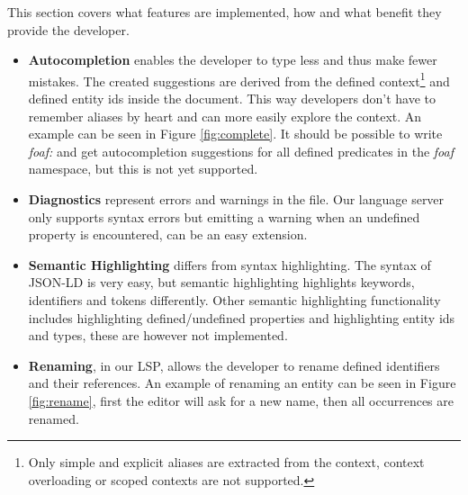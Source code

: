 \documentclass[
]{ceurart}
\begin{document}
This section covers what features are implemented, how and what benefit they provide the developer.

\begin{itemize}
  \item \textbf{Autocompletion} enables the developer to type less and thus make fewer mistakes.
    The created suggestions are derived from the defined context\footnote{Only simple and explicit aliases are extracted from the context, context overloading or scoped contexts are not supported.} and defined entity ids inside the document.
    This way developers don't have to remember aliases by heart and can more easily explore the context.
    An example can be seen in Figure \ref{fig:complete}.
    It should be possible to write \textit{foaf:} and get autocompletion suggestions for all defined predicates in the \textit{foaf} namespace, but this is not yet supported.
  \item \textbf{Diagnostics} represent errors and warnings in the file.
    Our language server only supports syntax errors but emitting a warning when an undefined property is encountered, can be an easy extension.
  \item \textbf{Semantic Highlighting} differs from syntax highlighting.
    The syntax of JSON-LD is very easy, but semantic highlighting highlights keywords, identifiers and tokens differently.
    Other semantic highlighting functionality includes highlighting defined/undefined properties and highlighting entity ids and types, these are however not implemented.
  \item \textbf{Renaming}, in our LSP, allows the developer to rename defined identifiers and their references.
    An example of renaming an entity can be seen in Figure \ref{fig:rename}, first the editor will ask for a new name, then all occurrences are renamed.
\end{itemize}
\end{document}
